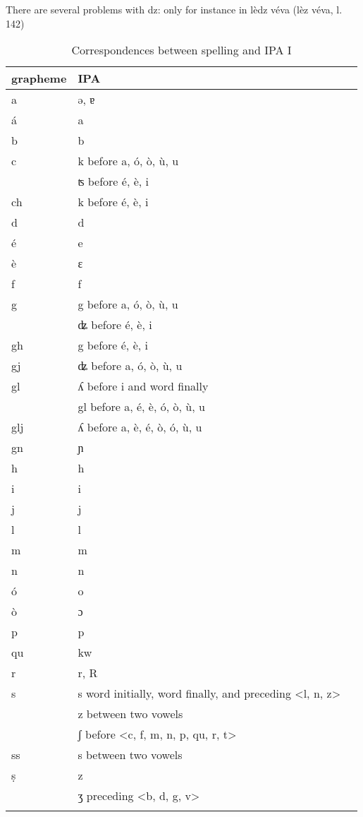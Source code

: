 There are several problems with dz: only for instance in lèdz véva (lèz véva, l. 142)


\begin{table}
\caption{Correspondences between spelling and IPA I}
\label{graphIpaI} 
\begin{tabular}{lll}
    \lsptoprule
        grapheme      & IPA\\
    \midrule  
  a & ə, ɐ\\
  á & a\\
  b & b\\
  c & k before a, ó, ò, ù, u\\
  & ʦ before é, è, i\\
  ch & k before é, è, i\\
  d & d\\
  é & e\\
  è & ɛ\\
  f & f\\
  g & g before a, ó, ò, ù, u\\
  & ʥ before é, è, i\\
  gh & g before é, è, i\\
  gj & ʥ before a, ó, ò, ù, u\\
  gl & ʎ before i and word finally\\
  & gl before a, é, è, ó, ò, ù, u\\
  glj & ʎ before a, è, é, ò, ó, ù, u\\
  gn& ɲ\\
  h & h\\
  i & i\\
  j & j\\
  l & l\\
  m & m\\
  n & n\\
  ó & o\\
  ò & ɔ\\
  p & p\\
  qu & kw\\
  r & r, R\\
  s & s word initially, word finally, and preceding <l, n, z>\\
  & z between two vowels\\
  & ʃ before <c, f, m, n, p, qu, r, t>\\
  ss & s between two vowels\\
  ṣ & z\\
  & ʒ preceding <b, d, g, v>\\
  \lspbottomrule
\end{tabular} 
\end{table}


